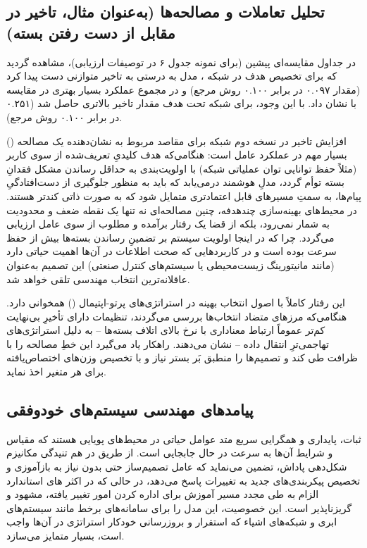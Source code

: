 \documentclass[oneside,openany,phd]{TMU-Thesis}
\begin{document}
\subsection{تحلیل تعاملات و مصالحه‌ها (به‌عنوان مثال، تاخیر در مقابل از دست رفتن بسته)}

در جداول مقایسه‌ای پیشین (برای نمونه جدول ۶ در توصیفات ارزیابی)، مشاهده گردید که برای تخصیص هدف  در شبکه ، مدل  به درستی به تاخیر متوازنی دست پیدا کرد (مقدار ۰.۰۹۷ در برابر ۰.۱۰۰ روش مرجع) و در مجموع عملکرد بسیار بهتری در مقایسه با  نشان داد. با این وجود، برای شبکه  تحت هدف  مقدار تاخیر بالاتری حاصل شد (۰.۲۵۱ در برابر ۰.۱۰۰ روش مرجع).

افزایش تاخیر در نسخه دوم شبکه برای مقاصد مربوط به  نشان‌دهنده یک مصالحه () بسیار مهم در عملکرد عامل است: هنگامی‌که هدف کلیدیِ تعریف‌شده از سوی کاربر (مثلاً حفظ توانایی توان عملیاتی شبکه) با اولویت‌بندی به حداقل رساندن مشکل فقدانِ بسته توأم گردد، مدلِ هوشمند درمی‌یابد که باید به منظور جلوگیری از دست‌افتادگیِ پیام‌ها، به سمتِ مسیرهای قابل اعتمادتری متمایل شود که به صورت ذاتی کندتر هستند. در محیط‌های بهینه‌سازی چندهدفه، چنین مصالحه‌ای نه تنها یک نقطه ضعف و محدودیت به شمار نمی‌رود، بلکه از قضا یک رفتار برآمده و مطلوب از سوی عامل ارزیابی می‌گردد. چرا که در اینجا اولویت سیستم بر تضمینِ رساندن بسته‌ها بیش از حفظ سرعت بوده است و در کاربردهایی که صحت اطلاعات در آن‌ها اهمیت حیاتی دارد (مانند مانیتورینگ زیست‌محیطی یا سیستم‌های کنترل صنعتی) این تصمیم به‌عنوان عاقلانه‌ترین انتخاب مهندسی تلقی خواهد شد.

این رفتار کاملاً با اصول انتخاب بهینه در استراتژی‌های پرتو-اپتیمال () همخوانی دارد. هنگامی‌که مرزهای متضاد انتخاب‌ها بررسی می‌گردند، تنظیمات دارای تأخیرِ بی‌نهایت کم‌تر عموماً ارتباط معناداری با نرخ بالای اتلاف بسته‌ها – به دلیل استراتژی‌های تهاجمی‌ترِ انتقال داده – نشان می‌دهند. راهکار  یاد می‌گیرد این خطِ مصالحه را با ظرافت طی کند و تصمیم‌ها را منطبق بَر بستر نیاز و با تخصیص وزن‌های اختصاص‌یافته برای هر متغیر اخذ نماید.

\subsection{پیامدهای مهندسی سیستم‌های خودوفقی}

ثبات، پایداری و همگرایی سریع متد  عوامل حیاتی در محیط‌های پویایی هستند که مقیاس و شرایط آن‌ها به سرعت در حال جابجایی است. از طریق در هم تنیدگی مکانیزم شکل‌دهی پاداش،  تضمین می‌نماید که عامل تصمیم‌ساز حتی بدون نیاز به بازآموزی و تخصیص پیکربندی‌های جدید به تغییرات پاسخ می‌دهد، در حالی که در اکثر های استاندارد الزام به طی مجدد مسیر آموزش برای اداره کردن امور تغییر یافته، مشهود و گریز‌ناپذیر است. این خصوصیت، این مدل را برای سامانه‌های برخط مانند سیستم‌های ابری و شبکه‌های اشیاء که استقرار و بروزرسانی خودکار استراتژی در آن‌ها واجب است، بسیار متمایز می‌سازد.
\end{document}
